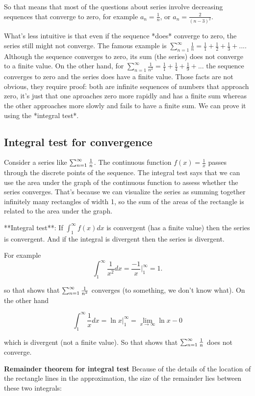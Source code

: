 So that means that most of the questions about series involve decreasing sequences that converge to zero, for example $a_n = \frac{1}{n}$, or $a_n = \frac{2}{(n-3)^2}$.

What's less intuitive is that even if the sequence *does* converge to zero, the series still might not converge. The famous example is $\sum_{n=1}^\infty \frac{1}{n} = \frac{1}{1} + \frac{1}{2} + \frac{1}{3} + ...$. Although the sequence converges to zero, its sum (the series) does not converge to a finite value. On the other hand, for $\sum_{n=1}^\infty \frac{1}{n^2} = \frac{1}{1} + \frac{1}{4} + \frac{1}{9} + ...$ the sequence converges to zero and the series does have a finite value. Those facts are not obvious, they require proof: both are infinite sequences of numbers that approach zero, it's just that one aproaches zero more rapidly and has a finite sum whereas the other approaches more slowly and fails to have a finite sum. We can prove it using the *integral test*.

\subsection{Integral test for convergence}
Consider a series like $\sum_{n=1}^{\infty} \frac{1}{n}$. The continuous function $f(x) = \frac{1}{x}$ passes through the discrete points of the sequence. The integral test says that we can use the area under the graph of the continuous function to assess whether the series converges. That's because we can visualize the series as summing together infinitely many rectangles of width 1, so the sum of the areas of the rectangle is related to the area under the graph.

**Integral test**: If $\int_1^\infty f(x) dx$ is convergent (has a finite value) then the series is convergent. And if the integral is divergent then the series is divergent.

For example
$$
\int_1^\infty \frac{1}{x^2} dx = \frac{-1}{x} \Big|_1^\infty = 1.
$$

so that shows that $\sum_{n=1}^{\infty} \frac{1}{n^2}$ converges (to something, we don't know what). On the other hand

$$
\int_1^\infty \frac{1}{x} dx = \ln x \Big|_1^\infty = \lim_{x \to \infty} \ln x - 0
$$

which is divergent (not a finite value). So that shows that $\sum_{n=1}^{\infty} \frac{1}{n}$ does not converge.

\textbf*{Remainder theorem for integral test}
Because of the details of the location of the rectangle lines in the approximation, the size of the remainder lies between these two integrals:

